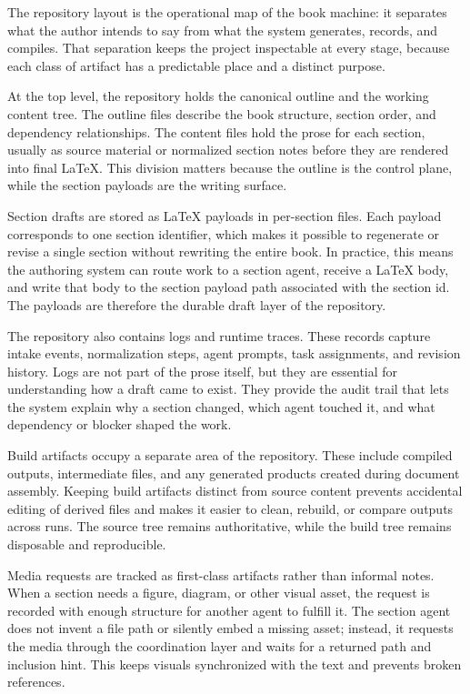 The repository layout is the operational map of the book machine: it separates what the author intends to say from what the system generates, records, and compiles. That separation keeps the project inspectable at every stage, because each class of artifact has a predictable place and a distinct purpose.

At the top level, the repository holds the canonical outline and the working content tree. The outline files describe the book structure, section order, and dependency relationships. The content files hold the prose for each section, usually as source material or normalized section notes before they are rendered into final \LaTeX{}. This division matters because the outline is the control plane, while the section payloads are the writing surface.

Section drafts are stored as \LaTeX{} payloads in per-section files. Each payload corresponds to one section identifier, which makes it possible to regenerate or revise a single section without rewriting the entire book. In practice, this means the authoring system can route work to a section agent, receive a \LaTeX{} body, and write that body to the section payload path associated with the section id. The payloads are therefore the durable draft layer of the repository.

The repository also contains logs and runtime traces. These records capture intake events, normalization steps, agent prompts, task assignments, and revision history. Logs are not part of the prose itself, but they are essential for understanding how a draft came to exist. They provide the audit trail that lets the system explain why a section changed, which agent touched it, and what dependency or blocker shaped the work.

Build artifacts occupy a separate area of the repository. These include compiled outputs, intermediate files, and any generated products created during document assembly. Keeping build artifacts distinct from source content prevents accidental editing of derived files and makes it easier to clean, rebuild, or compare outputs across runs. The source tree remains authoritative, while the build tree remains disposable and reproducible.

Media requests are tracked as first-class artifacts rather than informal notes. When a section needs a figure, diagram, or other visual asset, the request is recorded with enough structure for another agent to fulfill it. The section agent does not invent a file path or silently embed a missing asset; instead, it requests the media through the coordination layer and waits for a returned path and inclusion hint. This keeps visuals synchronized with the text and prevents broken references.

